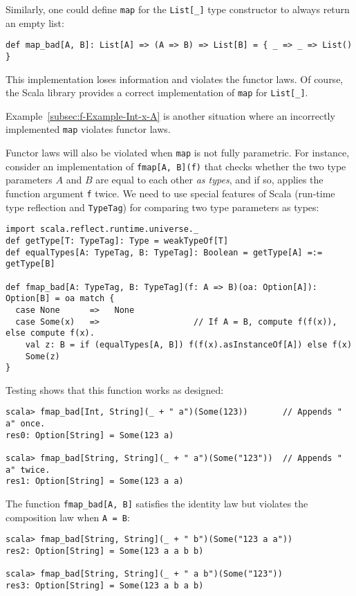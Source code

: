 Similarly, one could define \lstinline!map! for the \lstinline!List[_]!
type constructor to always return an empty list:
\begin{lstlisting}
def map_bad[A, B]: List[A] => (A => B) => List[B] = { _ => _ => List() }
\end{lstlisting}
This implementation loses information and violates the functor laws.
Of course, the Scala library provides a correct implementation of
\lstinline!map! for \lstinline!List[_]!.

Example~\ref{subsec:f-Example-Int-x-A} is another situation where
an incorrectly implemented \lstinline!map! violates functor laws.

Functor laws will also be violated when \lstinline!map! is not fully
parametric. For instance, consider an implementation of \lstinline!fmap[A, B](f)!
that checks whether the two type parameters $A$ and $B$ are equal
to each other \emph{as types}, and if so, applies the function argument
\lstinline!f! twice. We need to use special features of Scala (run-time
type reflection and \lstinline!TypeTag!)
for comparing two type parameters as types:
\begin{lstlisting}
import scala.reflect.runtime.universe._
def getType[T: TypeTag]: Type = weakTypeOf[T]
def equalTypes[A: TypeTag, B: TypeTag]: Boolean = getType[A] =:= getType[B]

def fmap_bad[A: TypeTag, B: TypeTag](f: A => B)(oa: Option[A]): Option[B] = oa match {
  case None      =>   None
  case Some(x)   =>                   // If A = B, compute f(f(x)), else compute f(x).
    val z: B = if (equalTypes[A, B]) f(f(x).asInstanceOf[A]) else f(x)
    Some(z)
}
\end{lstlisting}
Testing shows that this function works as designed:
\begin{lstlisting}
scala> fmap_bad[Int, String](_ + " a")(Some(123))       // Appends " a" once.
res0: Option[String] = Some(123 a)

scala> fmap_bad[String, String](_ + " a")(Some("123"))  // Appends " a" twice.
res1: Option[String] = Some(123 a a)
\end{lstlisting}
The function \lstinline!fmap_bad[A, B]! satisfies the identity law
but violates the composition law when \lstinline!A = B!:
\begin{lstlisting}
scala> fmap_bad[String, String](_ + " b")(Some("123 a a"))
res2: Option[String] = Some(123 a a b b)

scala> fmap_bad[String, String](_ + " a b")(Some("123"))
res3: Option[String] = Some(123 a b a b)
\end{lstlisting}

